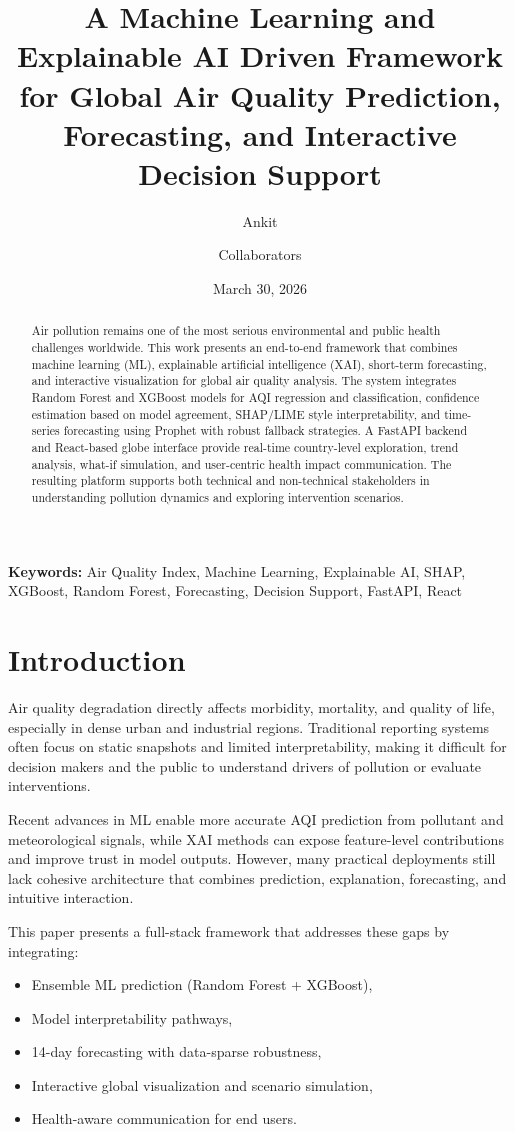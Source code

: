 \documentclass[12pt,a4paper]{article}
\title{\textbf{A Machine Learning and Explainable AI Driven Framework for\newline
Global Air Quality Prediction, Forecasting, and Interactive Decision Support}}
\author{Ankit \and Collaborators}
\date{March 30, 2026}
\begin{document}
\maketitle

\begin{abstract}
Air pollution remains one of the most serious environmental and public health challenges worldwide. This work presents an end-to-end framework that combines machine learning (ML), explainable artificial intelligence (XAI), short-term forecasting, and interactive visualization for global air quality analysis. The system integrates Random Forest and XGBoost models for AQI regression and classification, confidence estimation based on model agreement, SHAP/LIME style interpretability, and time-series forecasting using Prophet with robust fallback strategies. A FastAPI backend and React-based globe interface provide real-time country-level exploration, trend analysis, what-if simulation, and user-centric health impact communication. The resulting platform supports both technical and non-technical stakeholders in understanding pollution dynamics and exploring intervention scenarios.
\end{abstract}

\textbf{Keywords:} Air Quality Index, Machine Learning, Explainable AI, SHAP, XGBoost, Random Forest, Forecasting, Decision Support, FastAPI, React

\section{Introduction}
Air quality degradation directly affects morbidity, mortality, and quality of life, especially in dense urban and industrial regions. Traditional reporting systems often focus on static snapshots and limited interpretability, making it difficult for decision makers and the public to understand drivers of pollution or evaluate interventions.

Recent advances in ML enable more accurate AQI prediction from pollutant and meteorological signals, while XAI methods can expose feature-level contributions and improve trust in model outputs. However, many practical deployments still lack cohesive architecture that combines prediction, explanation, forecasting, and intuitive interaction.

This paper presents a full-stack framework that addresses these gaps by integrating:
\begin{itemize}[leftmargin=*]
    \item Ensemble ML prediction (Random Forest + XGBoost),
    \item Model interpretability pathways,
    \item 14-day forecasting with data-sparse robustness,
    \item Interactive global visualization and scenario simulation,
    \item Health-aware communication for end users.
\end{itemize}
\end{document}
